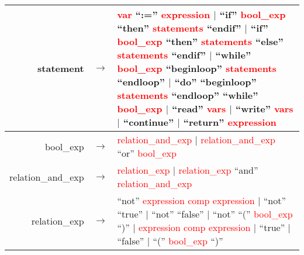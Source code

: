 \documentclass{article}[12pt]
\newcommand{\prodrule}[1]{#1}
\newcommand{\nonterm}[1]{\textcolor{red}{#1}}
\newcommand{\term}[1]{#1}
\begin{document}
\begin{tabular}{r c p{10cm}}
	\prodrule{statement} & $\rightarrow$ &
		        \nonterm{var} \term{``:=''} \nonterm{expression} \newline
		$\vert$ \term{``if''} \nonterm{bool\_exp} \term{``then''} \nonterm{statements} \term{``endif''} \newline
		$\vert$ \term{``if''} \nonterm{bool\_exp} \term{``then''} \nonterm{statements} \term{``else''} \nonterm{statements} \term{``endif''} \newline
		$\vert$ \term{``while''} \nonterm{bool\_exp} \term{``beginloop''} \nonterm{statements} \term{``endloop''} \newline
		$\vert$ \term{``do''} \term{``beginloop''} \nonterm{statements} \term{``endloop''} \term{``while''} \nonterm{bool\_exp} \newline
		$\vert$ \term{``read''} \nonterm{vars} \newline
		$\vert$ \term{``write''} \nonterm{vars} \newline
		$\vert$ \term{``continue''} \newline
		$\vert$ \term{``return''} \nonterm{expression} \\
	\hline

	\prodrule{bool\_exp} & $\rightarrow$ &
                \nonterm{relation\_and\_exp} \newline
        $\vert$ \nonterm{relation\_and\_exp} \term{``or''} \nonterm{bool\_exp} \\
	\hline

	\prodrule{relation\_and\_exp} & $\rightarrow$ &
		        \nonterm{relation\_exp} \newline
        $\vert$ \nonterm{relation\_exp} \term{``and''} \nonterm{relation\_and\_exp} \\
	\hline

	\prodrule{relation\_exp} & $\rightarrow$ &
		        \term{``not''} \nonterm{expression} \nonterm{comp} \nonterm{expression} \newline
		$\vert$ \term{``not''} \term{``true''} \newline
		$\vert$ \term{``not''} \term{``false''} \newline
		$\vert$ \term{``not''} \term{``(''} \nonterm{bool\_exp} \term{``)''} \newline
		$\vert$ \nonterm{expression} \nonterm{comp} \nonterm{expression} \newline
		$\vert$ \term{``true''} \newline
		$\vert$ \term{``false''} \newline
		$\vert$ \term{``(''} \nonterm{bool\_exp} \term{``)''} \\
	\hline


\end{tabular}
\end{document}
